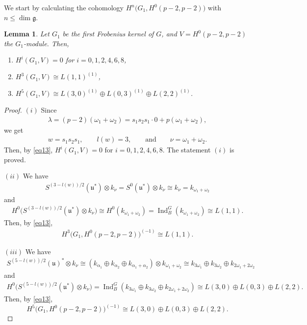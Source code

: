 \documentclass[10pt,a4paper]{amsart}
\numberwithin{equation}{section}
\newtheorem{Lemma}[Theorem]{Lemma}
\begin{document}
We start by calculating the cohomology $H^n\big(G_1,H^0(p-2,p-2)\big)$ with $n\leq \dim \mathfrak{g}$.

{\samepage\begin{Lemma}\label{l6}
Let $G_1$ be the first Frobenius kernel of $G$, and $V=H^0(p-2,p-2)$ the $G_1$-module. Then,
\begin{enumerate}\itemsep=0pt

\item[$(i)$] $H^{i}(G_1,V)=0$ for $i=0,1,2,4,6,8$,

\item[$(ii)$] $H^{3}(G_1,V)\cong L(1,1)^{(1)}$,

\item[$(iii)$] $H^5(G_1,V)\cong L(3,0)^{(1)}\oplus L(0,3)^{(1)}\oplus L(2,2)^{(1)}$.
\end{enumerate}
\end{Lemma}

}

\begin{proof}
$(i)$ Since
\begin{gather*}
\lambda=(p-2)(\omega_1+\omega_2)=s_1s_2s_1\cdot 0+p(\omega_1+\omega_2),
\end{gather*}
we get
\begin{gather*}
w=s_1s_2s_1,\qquad l(w)=3,\qquad\text{and}\qquad\nu=\omega_1+\omega_2.
\end{gather*}
Then, by \eqref{eq13},
$H^{i}(G_1,V)=0$ for $i=0,1,2,4,6,8$. The statement $(i)$ is proved.

$(ii)$ We have
\begin{gather*}
S^{(3-l(w))/2}(\mathfrak{u}^*)\otimes k_{\nu}=S^0(\mathfrak{u}^*)\otimes k_{\nu}\cong k_{\nu}=k_{\omega_1+\omega_2}
\end{gather*}
and
\begin{gather*}
H^0\big(S^{(3-l(w))/2}(\mathfrak{u}^*)\otimes k_{\nu}\big)\cong H^0(k_{\omega_1+\omega_2})=\operatorname{Ind}_B^{G}(k_{\omega_1+\omega_2})\cong L(1,1).
\end{gather*}
Then, by \eqref{eq13},
\begin{gather*}
H^3\big(G_1,H^0(p-2,p-2)\big)^{(-1)}\cong L(1,1).
\end{gather*}

$(iii)$ We have
\begin{gather*}
S^{(5-l(w))/2}(\mathfrak{u})^*\otimes k_{\nu}\cong (k_{\alpha_1}\oplus
k_{\alpha_2}\oplus k_{\alpha_1+\alpha_2})\otimes k_{\omega_1+\omega_2}\cong
k_{3\omega_1}\oplus k_{3\omega_2}\oplus k_{2\omega_1+2\omega_2}
\end{gather*}
and
\begin{gather*}
H^0\big(S^{(5-l(w))/2}(\mathfrak{u}^*)\otimes k_{\nu}\big)=\operatorname{Ind}_B^{G}(k_{3\omega_1}\oplus k_{3\omega_2}\oplus k_{2\omega_1+2\omega_2})
 \cong L(3,0)\oplus L(0,3)\oplus L(2,2).
 \end{gather*}
Then, by \eqref{eq13},
\begin{equation*}
H^5\big(G_1,H^0(p-2,p-2)\big)^{(-1)}\cong L(3,0)\oplus L(0,3)\oplus L(2,2).
\end{equation*}
\renewcommand{\qed}{}
\end{proof}
\end{document}
